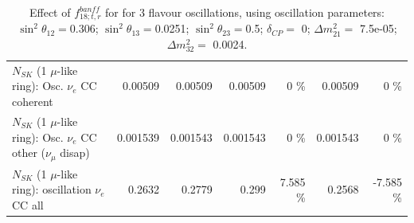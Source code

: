 \begin{table}
\begin{tabular}{| l | r | r | r  r | r  r |}
                          $N_{SK}$ (1 $\mu$-like ring): Osc. $\nu_e$ CC coherent &         0.00509 &         0.00509 &         0.00509 &        0 \%  &         0.00509 &        0 \%  \\ 
           $N_{SK}$ (1 $\mu$-like ring): Osc. $\nu_e$ CC other ($\nu_\mu$ disap) &        0.001539 &        0.001543 &        0.001543 &        0 \%  &        0.001543 &        0 \%  \\ 
                        $N_{SK}$ (1 $\mu$-like ring): oscillation $\nu_e$ CC all &          0.2632 &          0.2779 &           0.299 &    7.585 \%  &          0.2568 &   -7.585 \%  \\ 
\hline
\hline
\end{tabular}
\caption{ Effect of $f_{18; t, r}^{banff}$ for for 3 flavour oscillations, using oscillation parameters:  $\sin^2\theta_{12} = $0.306; $\sin^2\theta_{13} = $0.0251; $\sin^2\theta_{23} = $0.5; $\delta_{CP} = $        0; $\Delta m^2_{21} = $    7.5e-05; $\Delta m^2_{32} = $    0.0024. }
\label{tab:num_banff_ccqeE0_1RmuT_3f_osc_t13:0.0251}
\end{table}
\clearpage
